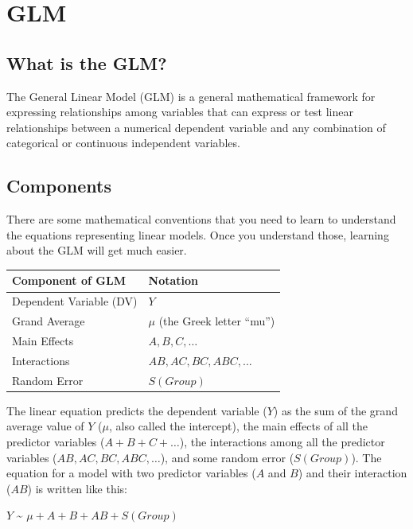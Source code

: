 \documentclass[
  oneside]{book}
\begin{document}
\hypertarget{glm-1}{%
\section{GLM}\label{glm-1}}

\hypertarget{what-is-the-glm}{%
\subsection{What is the GLM?}\label{what-is-the-glm}}

The General Linear Model (GLM) is a general mathematical framework for expressing relationships among variables that can express or test linear relationships between a numerical dependent variable and any combination of categorical or continuous independent variables.

\hypertarget{glm-components}{%
\subsection{Components}\label{glm-components}}

There are some mathematical conventions that you need to learn to understand the equations representing linear models. Once you understand those, learning about the GLM will get much easier.

\begin{longtable}[]{@{}ll@{}}
\toprule
Component of GLM & Notation \\
\midrule
\endhead
Dependent Variable (DV) & \(Y\) \\
Grand Average & \(\mu\) (the Greek letter ``mu'') \\
Main Effects & \(A, B, C, \ldots\) \\
Interactions & \(AB, AC, BC, ABC, \ldots\) \\
Random Error & \(S(Group)\) \\
\bottomrule
\end{longtable}

The linear equation predicts the dependent variable (\(Y\)) as the sum of the grand average value of \(Y\) (\(\mu\), also called the intercept), the main effects of all the predictor variables (\(A+B+C+ \ldots\)), the interactions among all the predictor variables (\(AB, AC, BC, ABC, \ldots\)), and some random error (\(S(Group)\)). The equation for a model with two predictor variables (\(A\) and \(B\)) and their interaction (\(AB\)) is written like this:

\(Y\) \textasciitilde{} \(\mu+A+B+AB+S(Group)\)
\end{document}
